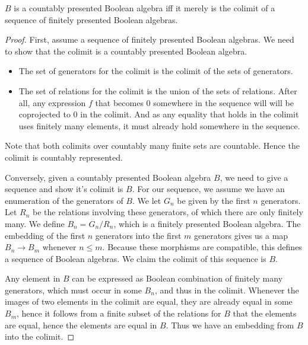 
\begin{lemma}
  $B$ is a countably presented Boolean algebra iff 
  it merely is the colimit of a sequence of finitely presented Boolean algebras.%
\end{lemma} 
\begin{proof}
  First, assume a sequence of finitely presented Boolean algebras. 
  We need to show that the colimit is a countably presented Boolean algebra. 
  \begin{itemize}
    \item The set of generators for the colimit is the colimit of the sets of generators. 
    \item The set of relations for the colimit is the union of the sets of relations. 
      After all, any expression $f$ that becomes $0$ somewhere in the sequence will will be coprojected to $0$
      in the colimit. And as any equality that holds in the colimit uses finitely many elements, 
      it must already hold somewhere in the sequence. 
  \end{itemize}
  Note that both colimits over countably many finite sets are countable. 
  Hence the colimit is countably represented. 

  Conversely, given a countably presented Boolean algebra $B$, we need to give a sequence and show it's colimit is $B$. 
  For our sequence, we assume we have an enumeration of the generators of $B$. 
  We let $G_n$ be given by the first $n$ generators. 
  Let $R_n$ be the relations involving these generators, 
  of which there are only finitely many. 
  We define $B_n = G_n/R_n$, which is a finitely presented Boolean algebra. 
  The embedding of the first $n$ generators into the first $m$ generators gives us 
  a map $B_n \to B_m$ whenever $n\leq m$. 
  Because these morphisms are compatible, this defines a sequence of Boolean algebras. 
  We claim the colimit of this sequence is $B$. 

  Any element in $B$ can be expressed as Boolean combination of finitely many generators, 
  which must occur in some $B_n$, and thus in the colimit. 
  Whenever the images of two elements in the colimit are equal, they are already equal in some $B_m$, 
  hence it follows from a finite subset of the relations for $B$ that the elements are equal, 
  hence the elements are equal in $B$. Thus we have an embedding from $B$ into the colimit. 


\end{proof}
